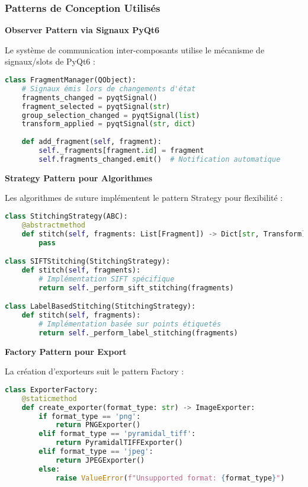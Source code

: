 \documentclass[12pt,a4paper]{report}
\begin{document}
\subsubsection{Patterns de Conception Utilisés}

\textbf{Observer Pattern via Signaux PyQt6}

Le système de communication inter-composants utilise le mécanisme de signaux/slots de PyQt6 :

\begin{lstlisting}[language=Python]
class FragmentManager(QObject):
    # Signaux émis lors de changements d'état
    fragments_changed = pyqtSignal()
    fragment_selected = pyqtSignal(str)
    group_selection_changed = pyqtSignal(list)
    transform_applied = pyqtSignal(str, dict)
    
    def add_fragment(self, fragment):
        self._fragments[fragment.id] = fragment
        self.fragments_changed.emit()  # Notification automatique
\end{lstlisting}

\textbf{Strategy Pattern pour Algorithmes}

Les algorithmes de suture implémentent le pattern Strategy pour flexibilité :

\begin{lstlisting}[language=Python]
class StitchingStrategy(ABC):
    @abstractmethod
    def stitch(self, fragments: List[Fragment]) -> Dict[str, Transform]:
        pass

class SIFTStitching(StitchingStrategy):
    def stitch(self, fragments):
        # Implémentation SIFT spécifique
        return self._perform_sift_stitching(fragments)

class LabelBasedStitching(StitchingStrategy):
    def stitch(self, fragments):
        # Implémentation basée sur points étiquetés
        return self._perform_label_stitching(fragments)
\end{lstlisting}

\textbf{Factory Pattern pour Export}

La création d'exporteurs suit le pattern Factory :

\begin{lstlisting}[language=Python]
class ExporterFactory:
    @staticmethod
    def create_exporter(format_type: str) -> ImageExporter:
        if format_type == 'png':
            return PNGExporter()
        elif format_type == 'pyramidal_tiff':
            return PyramidalTIFFExporter()
        elif format_type == 'jpeg':
            return JPEGExporter()
        else:
            raise ValueError(f"Unsupported format: {format_type}")
\end{lstlisting}
\end{document}
